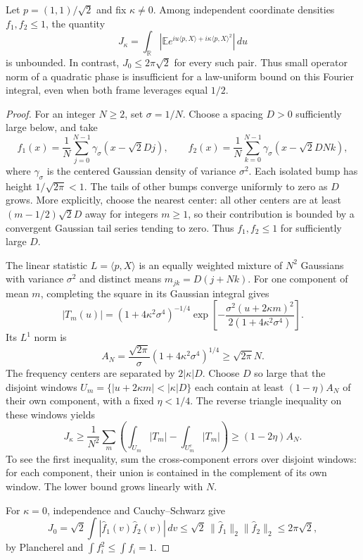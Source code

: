 \begin{theorem}\label{lim:twist}
Let $p=(1,1)/\sqrt2$ and fix $\kappa\ne0$. Among independent coordinate densities $f_1,f_2\le1$, the quantity
\[
 J_\kappa=\int_{\mathbb R}\left|\mathbb E
 e^{iu\langle p,X\rangle+i\kappa\langle p,X\rangle^2}\right|\,du
\]
is unbounded. In contrast, $J_0\le2\pi\sqrt2$ for every such pair. Thus small operator norm of a quadratic phase is insufficient for a law-uniform bound on this Fourier integral, even when both frame leverages equal $1/2$.
\end{theorem}
\begin{proof}
For an integer $N\ge2$, set $\sigma=1/N$. Choose a spacing $D>0$ sufficiently large below, and take
\[
 f_1(x)=\frac1N\sum_{j=0}^{N-1}\gamma_\sigma(x-\sqrt2Dj),
 \qquad
 f_2(x)=\frac1N\sum_{k=0}^{N-1}\gamma_\sigma(x-\sqrt2DNk),
\]
where $\gamma_\sigma$ is the centered Gaussian density of variance $\sigma^2$. Each isolated bump has height $1/\sqrt{2\pi}<1$. The tails of other bumps converge uniformly to zero as $D$ grows. More explicitly, choose the nearest center: all other centers are at least $(m-1/2)\sqrt2D$ away for integers $m\ge1$, so their contribution is bounded by a convergent Gaussian tail series tending to zero. Thus $f_1,f_2\le1$ for sufficiently large $D$.

The linear statistic $L=\langle p,X\rangle$ is an equally weighted mixture of $N^2$ Gaussians with variance $\sigma^2$ and distinct means $m_{jk}=D(j+Nk)$. For one component of mean $m$, completing the square in its Gaussian integral gives
\[
 |T_m(u)|=(1+4\kappa^2\sigma^4)^{-1/4}
 \exp\left[-\frac{\sigma^2(u+2\kappa m)^2}
 {2(1+4\kappa^2\sigma^4)}\right].
\]
Its $L^1$ norm is
\[
 A_N=\frac{\sqrt{2\pi}}\sigma(1+4\kappa^2\sigma^4)^{1/4}
 \ge\sqrt{2\pi}N.
\]
The frequency centers are separated by $2|\kappa|D$. Choose $D$ so large that the disjoint windows
$U_m=\{|u+2\kappa m|<|\kappa|D\}$ each contain at least $(1-\eta)A_N$ of their own component, with a fixed $\eta<1/4$. The reverse triangle inequality on these windows yields
\[
 J_\kappa\ge\frac1{N^2}\sum_m
 \left(\int_{U_m}|T_m|-\int_{U_m^c}|T_m|\right)
 \ge(1-2\eta)A_N.
\]
To see the first inequality, sum the cross-component errors over disjoint windows: for each component, their union is contained in the complement of its own window. The lower bound grows linearly with $N$.

For $\kappa=0$, independence and Cauchy--Schwarz give
\[
 J_0=\sqrt2\int|\widehat f_1(v)\widehat f_2(v)|\,dv
 \le\sqrt2\,\|\widehat f_1\|_2\|\widehat f_2\|_2
 \le2\pi\sqrt2,
\]
by Plancherel and $\int f_i^2\le\int f_i=1$.
\end{proof}

